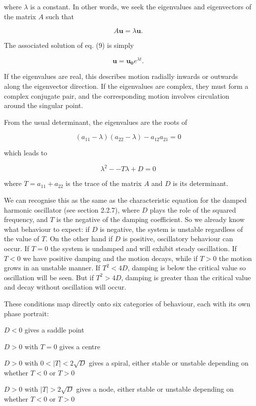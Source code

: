   where $\lambda$ is a constant. In other words, we seek the eigenvalues and 
  eigenvectors of the matrix $A$ such that 

  $$A \mathbf{u} = \lambda \mathbf{u} . \tag{10}$$ 

  The associated solution of eq. (9) is simply 

  $$\mathbf{u} = \mathbf{u_0} e^{\lambda t} . \tag{11}$$ 

  If the eigenvalues are real, this describes motion radially inwards or 
  outwards along the eigenvector direction. If the eigenvalues are complex, 
  they must form a complex conjugate pair, and the corresponding motion 
  involves circulation around the singular point. 

  From the usual determinant, the eigenvalues are the roots of 

  $$(a_{11}-\lambda)(a_{22}-\lambda)-a_{12} a_{21} =0 \tag{12}$$ 

  which leads to 

  $$\lambda^2 -- T \lambda +D =0 \tag{13}$$ 

  where $T=a_{11}+a_{22}$ is the trace of the matrix $A$ and $D$ is its 
  determinant. 

  We can recognise this as the same as the characteristic equation for the 
  damped harmonic oscillator (see section 2.2.7), where $D$ plays the role of 
  the squared frequency, and $T$ is the negative of the damping coefficient. So 
  we already know what behaviour to expect: if $D$ is negative, the system is 
  unstable regardless of the value of $T$. On the other hand if $D$ is 
  positive, oscillatory behaviour can occur. If $T=0$ the system is undamped 
  and will exhibit steady oscillation. If $T<0$ we have positive damping and 
  the motion decays, while if $T>0$ the motion grows in an unstable manner. If 
  $T^2 < 4D$, damping is below the critical value so oscillation will be seen. 
  But if $T^2 > 4D$, damping is greater than the critical value and decay 
  without oscillation will occur. 

  These conditions map directly onto six categories of behaviour, each with its 
  own phase portrait: 

  $D<0$ gives a saddle point 

  $D>0$ with $T=0$ gives a centre 

  $D>0$ with $0 < |T| < 2\sqrt{D}$ gives a spiral, either stable or unstable 
  depending on whether $T<0$ or $T>0$ 

  $D>0$ with $|T| > 2\sqrt{D}$ gives a node, either stable or unstable 
  depending on whether $T<0$ or $T>0$ 

